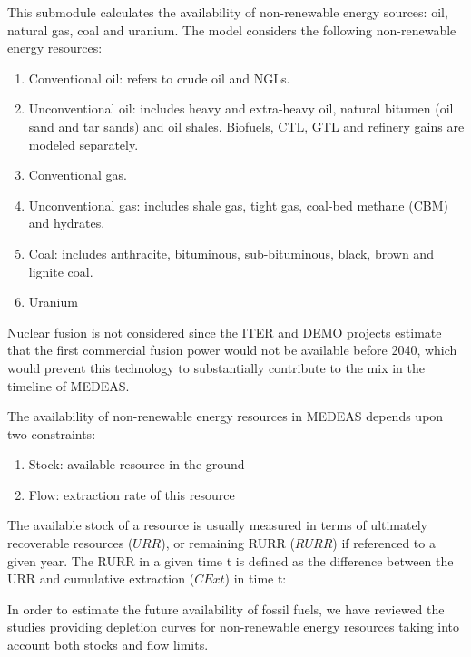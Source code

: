 

This submodule calculates the availability of non-renewable energy sources: oil, natural gas, coal and uranium.
The model considers the following non-renewable energy resources:

\begin{enumerate}
    \item Conventional oil: refers to crude oil and NGLs.
    \item Unconventional oil: includes heavy and extra-heavy oil, natural bitumen (oil sand and tar
    sands) and oil shales. Biofuels, CTL, GTL and refinery gains are modeled separately.
    \item Conventional gas.
    \item Unconventional gas: includes shale gas, tight gas, coal-bed methane (CBM) and hydrates.
    \item Coal: includes anthracite, bituminous, sub-bituminous, black, brown and lignite coal.
    \item Uranium
\end{enumerate}

Nuclear fusion is not considered since the ITER and DEMO projects
estimate that the first commercial fusion power would not be available before 2040, which would prevent this technology to substantially contribute to the mix
in the timeline of MEDEAS.

The availability of non-renewable energy resources in MEDEAS depends upon two constraints:

\begin{enumerate}
    \item Stock: available resource in the ground
    \item Flow: extraction rate of this resource
\end{enumerate}

The available stock of a resource is usually measured in terms of ultimately recoverable resources
($URR$), or remaining RURR ($RURR$) if referenced to a given year. The RURR in a given time t is defined
as the difference between the URR and cumulative extraction ($CExt$) in time t:

In order to estimate the future availability of fossil fuels, we have reviewed the studies providing
depletion curves for non-renewable energy resources taking into account both stocks and flow
limits. 

